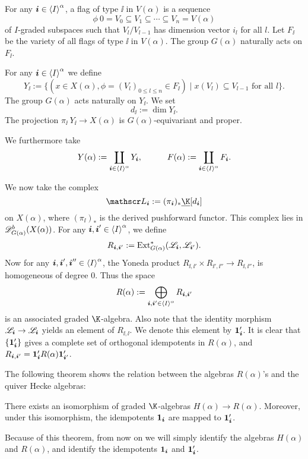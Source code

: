 For any $\boldsymbol{i}\in\left<I\right>^\alpha$, a flag of type $\ii$ in $V(\alpha)$ 
is a sequence 
\[
    \phi\:0 = V_0\subseteq V_1\subseteq\cdots
    \subseteq V_n = V(\alpha)
\] 
of $I$-graded subspaces such that
$V_l/V_{l-1}$ has dimension vector $i_l$ for all $l$.
Let $F_{\ii}$ be the variety of all flags of type $\ii$ in
$V(\alpha)$. The group $G(\alpha)$ naturally acts on $F_{\ii}$.

For any $\boldsymbol{i}\in\left<I\right>^\alpha$
we define 
\[
    Y_{\ii} := \{(x\in X(\alpha),\phi = (V_l)_{0\le l\le n}\in F_{\ii})\mid
    x(V_l)\subseteq V_{l-1}\text{ for all }l\}.
\] 
The group $G(\alpha)$ 
acts naturally on $Y_{\ii}$. We set 
\[
    d_{\ii} := \dim Y_{\ii}.
\]
The projection $\pi_{\ii}\:Y_{\ii}
\to X(\alpha)$ is $G(\alpha)$-equivariant and proper.

We furthermore take 
\[
    Y(\alpha) := \coprod_{\boldsymbol{i}\in\left<I\right>^\alpha}Y_{\boldsymbol{i}},
    \hspace{3em}F(\alpha) := \coprod_{\boldsymbol{i}\in\left<I\right>^\alpha}F_{\boldsymbol{i}}.
\]    

We now take the complex 
\[
    \LL_{\ii} := (\pi_{\ii})_*\underline{\K}[d_{\ii}]
\]    
on $X(\alpha)$, where $(\pi_{\ii})_*$ is the derived pushforward 
functor. This complex lies in $\mathscr{D}_{G(\alpha)}^b(X(\alpha))$.
For any $\boldsymbol{i},\boldsymbol{i}'\in\left<I\right>^\alpha$, we define $$R_{\boldsymbol{i},\boldsymbol{i}'}
 := \operatorname{Ext}^*_{G(\alpha)}(\mathscr{L}_{\boldsymbol{i}},\mathscr{L}_{\boldsymbol{i}'}).$$ Now for any 
$\boldsymbol{i},\boldsymbol{i}',\boldsymbol{i}''\in\left<I\right>^\alpha$, the Yoneda
product $R_{\ii,\ii'}\times R_{\ii',\ii''}\to R_{\ii,\ii''}$,
is homogeneous of degree $0$. Thus the space
\[
    R(\alpha) := \bigoplus_{\boldsymbol{i},\boldsymbol{i}'\in\left<I\right>^\alpha}R_{\boldsymbol{i},\boldsymbol{i}'}
\]    
is an associated graded $\K$-algebra. Also note that 
the identity morphism $\mathscr{L}_{\boldsymbol{i}}\to\mathscr{L}_{\boldsymbol{i}}$ yields 
an element of $R_{\ii,\ii}$. We denote this element by $\mathbf{1}_{\boldsymbol{i}}'$.
It is clear that $\{\mathbf{1}_{\boldsymbol{i}}'\}$ gives a complete set of
orthogonal idempotents in $R(\alpha)$, and $R_{\boldsymbol{i},\boldsymbol{i}'}
 = \mathbf{1}_{\boldsymbol{i}}'R(\alpha)\mathbf{1}_{\boldsymbol{i}'}'$.

The following theorem shows the relation between the 
algebras $R(\alpha)$'s and the quiver Hecke algebras:

\begin{theorem}\label{geo-real}
    There exists an isomorphism of graded $\K$-algebras
    $H(\alpha)\to R(\alpha)$. Moreover, under this isomorphism,
    the idempotents $\mathbf{1}_{\boldsymbol{i}}$ are mapped to $\mathbf{1}_{\boldsymbol{i}}'$.
\end{theorem}

Because of this theorem, from now on we will simply identify
the algebras $H(\alpha)$ and $R(\alpha)$, and identify the 
idempotents $\mathbf{1}_{\boldsymbol{i}}$ and $\mathbf{1}_{\boldsymbol{i}}'$.

